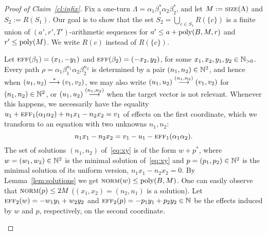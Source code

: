 
\begin{proof}[Proof of Claim~\ref{cl:infix}]
Fix a  one-turn \slps $\Lambda=\alpha_1\beta_1^*\alpha_2\beta_2^*$, and
let $M:=\textsc{size}(\Lambda)$ and $S_2 := R(S_1)$.
Our goal is to show that the set $S_2 = \bigcup_{c\in S_1} R(\{c\})$
is a finite union
of $(a', r', T')$-arithmetic sequences for $a' \leq a + \textup{poly}(B, M, r)$ and $r' \leq \textup{poly}(M)$.
We write $R(c)$ instead of $R(\{c\})$.

Let $\textsc{eff}(\beta_1) = (x_1, -y_1)$ and $\textsc{eff}(\beta_2) = (-x_2, y_2)$, for some $x_1, x_2, y_1, y_2 \in \mathbb{N}_{>0}$.
Every path $\rho = \alpha_1\beta_1^{n_1}\alpha_2\beta_2^{n_2}$ is determined by 
a pair $(n_1,n_2) \in \mathbb{N}^2$,
and hence when $(u_1, u_2) \stackrel{*}{\longrightarrow} (v_1, v_2)$, we may also write $(u_1, u_2) \stackrel{(n_1,n_2)}{\longrightarrow} (v_1, v_2)$
for $(n_1, n_2)\in\mathbb{N}^2$, or 
$(u_1, u_2) \stackrel{(n_1,n_2)}{\longrightarrow}$ when the target vector is not relevant.
Whenever this happens, we necessarily have the equality
$
u_1 + \textsc{eff}_1(\alpha_1 \alpha_2) + n_1 x_1 - n_2 x_2 = v_1
$
of effects on the first coordinate,
which we transform to an equation with two unknowns $n_1,  n_2$:
\begin{equation}\label{eq:xy}
n_1 x_1 - n_2 x_2 = v_1 - u_1 - \textsc{eff}_1(\alpha_1 \alpha_2).
\end{equation}
%
The set of solutions $(n_1, n_2)$ of~\eqref{eq:xy} is of the form $w+p^*$, 
where $w = (w_1, w_2) \in \mathbb{N}^2$ is the minimal solution of~\eqref{eq:xy}
and $p = (p_1, p_2) \in \mathbb{N}^2$ is the minimal solution of its uniform version, $n_1 x_1 - n_2 x_2 = 0$.
By Lemma~\ref{lem:solutions} we get $\textsc{norm}(w) \leq \textup{poly}(B, M)$. One can easily observe that $\textsc{norm}(p) \leq 2M$
($(x_1, x_2) = (n_2, n_1)$ is a solution).
%
Let $\textsc{eff}_2(w) = -w_1 y_1 + w_2 y_2$ and $\textsc{eff}_2(p) = -p_1 y_1 + p_2 y_2\in \mathbb{N}$ be 
the effects induced by $w$ and $p$, respectively, on the second coordinate.

\begin{example}\label{ex:infix}
\begin{figure}[t]
\vspace{-2cm}
\begin{minipage}{0.5\textwidth}
\end{minipage}
\end{figure}
\end{example}
\end{proof}
